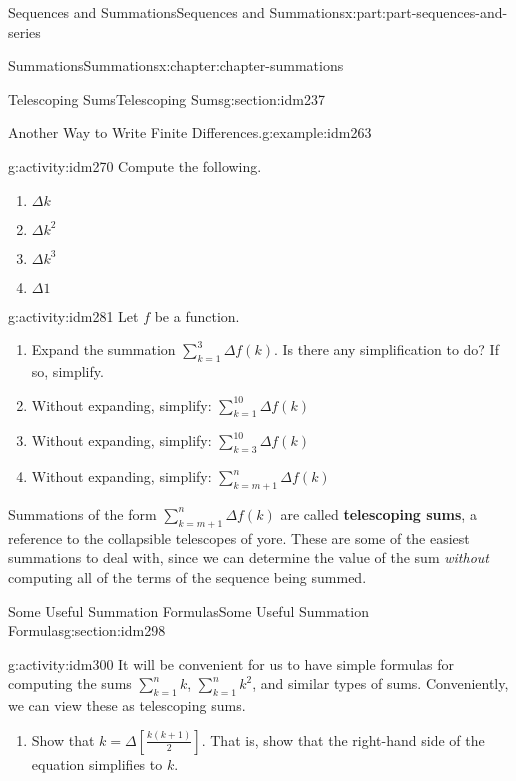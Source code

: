 \documentclass[oneside,10pt,]{book}
\newcommand{\terminology}[1]{\textbf{#1}}
\numberwithin{equation}{section}
\begin{document}
\begin{partptx}{Sequences and Summations}{}{Sequences and Summations}{}{}{x:part:part-sequences-and-series}
\begin{chapterptx}{Summations}{}{Summations}{}{}{x:chapter:chapter-summations}
\begin{sectionptx}{Telescoping Sums}{}{Telescoping Sums}{}{}{g:section:idm237}
\begin{example}{Another Way to Write Finite Differences.}{g:example:idm263}
\end{example}
\begin{activity}{}{g:activity:idm270}%
Compute the following.%
\begin{enumerate}[font=\bfseries,label=(\alph*),ref=\alph*]
\item{}\(\Delta k\)\item{}\(\Delta k^2\)\item{}\(\Delta k^3\)\item{}\(\Delta 1\)\end{enumerate}
\end{activity}
\begin{activity}{}{g:activity:idm281}%
Let \(f\) be a function.%
\begin{enumerate}[font=\bfseries,label=(\alph*),ref=\alph*]
\item{}Expand the summation \(\displaystyle\sum_{k = 1}^3 \Delta f(k)\). Is there any simplification to do? If so, simplify.%
\item{}Without expanding, simplify: \(\displaystyle\sum_{k = 1}^{10} \Delta f(k)\)\item{}Without expanding, simplify: \(\displaystyle\sum_{k = 3}^{10} \Delta f(k)\)\item{}Without expanding, simplify: \(\displaystyle\sum_{k = m+1}^{n} \Delta f(k)\)\end{enumerate}
\end{activity}
Summations of the form \(\displaystyle\sum_{k = m+1}^n \Delta f(k)\) are called \terminology{telescoping sums}, a reference to the collapsible telescopes of yore. These are some of the easiest summations to deal with, since we can determine the value of the sum \emph{without} computing all of the terms of the sequence being summed.%
\end{sectionptx}
%
%
\typeout{************************************************}
\typeout{************************************************}
%
\begin{sectionptx}{Some Useful Summation Formulas}{}{Some Useful Summation Formulas}{}{}{g:section:idm298}
\begin{activity}{}{g:activity:idm300}%
It will be convenient for us to have simple formulas for computing the sums \(\displaystyle\sum_{k=1}^n k\), \(\displaystyle\sum_{k=1}^n k^2\), and similar types of sums. Conveniently, we can view these as telescoping sums.%
\begin{enumerate}[font=\bfseries,label=(\alph*),ref=\alph*]
\item{}Show that \(k = \Delta \left[\frac{k(k+1)}{2}\right]\). That is, show that the right-hand side of the equation simplifies to \(k\).%

\end{enumerate}
\end{activity}
\end{sectionptx}
\end{chapterptx}
\end{partptx}
\end{document}
